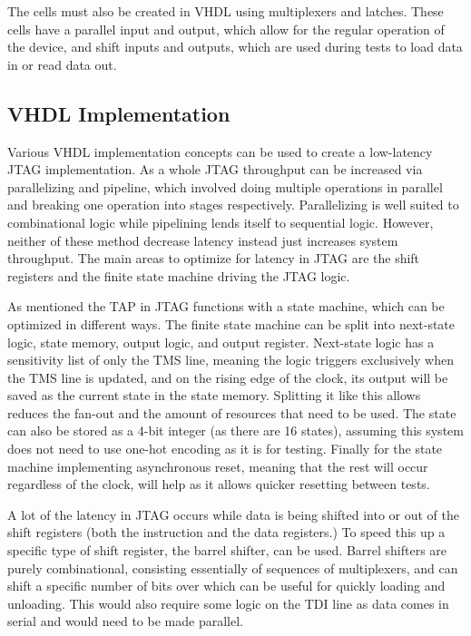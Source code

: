 \documentclass[11pt]{article}
\begin{document}
The cells must also be created in VHDL using multiplexers and latches. 
These cells have a parallel input and output, which allow for the regular operation of the device, and shift inputs and outputs, which are used during tests to load data in or read data out.

\subsection{VHDL Implementation}
Various VHDL implementation concepts can be used to create a low-latency JTAG implementation.
As a whole JTAG throughput can be increased via parallelizing and pipeline, which involved doing multiple operations in parallel and breaking one operation into stages respectively.
Parallelizing is well suited to combinational logic while pipelining lends itself to sequential logic.
However, neither of these method decrease latency instead just increases system throughput.
The main areas to optimize for latency in JTAG are the shift registers and the finite state machine driving the JTAG logic.

As mentioned the TAP in JTAG functions with a state machine, which can be optimized in different ways.
The finite state machine can be split into next-state logic, state memory, output logic, and output register.
Next-state logic has a sensitivity list of only the TMS line, meaning the logic triggers exclusively when the TMS line is updated, and on the rising edge of the clock, its output will be saved as the current state in the state memory.
Splitting it like this allows reduces the fan-out and the amount of resources that need to be used.
The state can also be stored as a 4-bit integer (as there are 16 states), assuming this system does not need to use one-hot encoding as it is for testing.
Finally for the state machine implementing asynchronous reset, meaning that the rest will occur regardless of the clock, will help as it allows quicker resetting between tests.

A lot of the latency in JTAG occurs while data is being shifted into or out of the shift registers (both the instruction and the data registers.)
To speed this up a specific type of shift register, the barrel shifter, can be used.
Barrel shifters are purely combinational, consisting essentially of sequences of multiplexers, and can shift a specific number of bits over which can be useful for quickly loading and unloading.
This would also require some logic on the TDI line as data comes in serial and would need to be made parallel.
\end{document}
